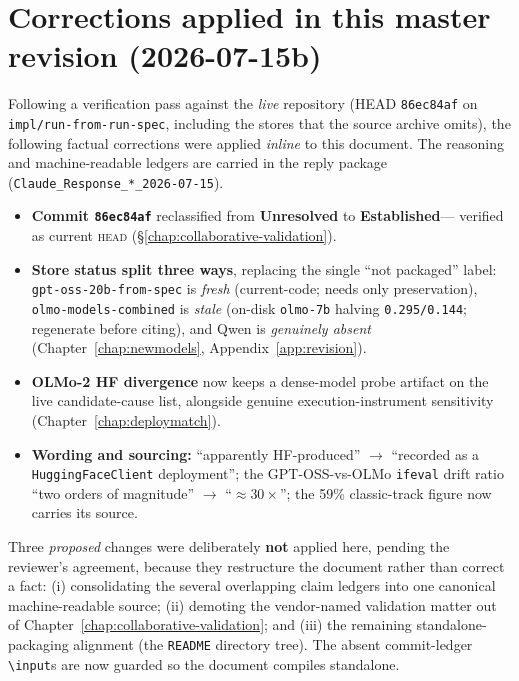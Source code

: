 \documentclass[11pt]{report}
\newcommand{\code}[1]{\texttt{#1}}
\newcommand{\file}[1]{\texttt{#1}}
\newcommand{\statusEstablished}{\textbf{Established}}
\newcommand{\statusUnresolved}{\textbf{Unresolved}}
\begin{document}
\section{Corrections applied in this master revision (2026-07-15b)}
\label{sec:corrections-applied}

Following a verification pass against the \emph{live} repository (HEAD \code{86ec84af}
on \code{impl/run-from-run-spec}, including the  stores that the source
archive omits), the following factual corrections were applied \emph{inline} to this
document. The reasoning and machine-readable ledgers are carried in the reply package
(\file{Claude\_Response\_*\_2026-07-15}).

\begin{itemize}[nosep]
  \item \textbf{Commit \code{86ec84af}} reclassified from \statusUnresolved{} to
        \statusEstablished --- verified as current \textsc{head}
        (\S\ref{chap:collaborative-validation}).
  \item \textbf{Store status split three ways}, replacing the single ``not packaged''
        label: \code{gpt-oss-20b-from-spec} is \emph{fresh} (current-code; needs only
        preservation), \code{olmo-models-combined} is \emph{stale} (on-disk
        \code{olmo-7b} halving \code{0.295/0.144}; regenerate before citing), and Qwen
        is \emph{genuinely absent} (Chapter~\ref{chap:newmodels},
        Appendix~\ref{app:revision}).
  \item \textbf{OLMo-2 HF divergence} now keeps a dense-model probe artifact on the
        live candidate-cause list, alongside genuine execution-instrument sensitivity
        (Chapter~\ref{chap:deploymatch}).
  \item \textbf{Wording and sourcing:} ``apparently HF-produced'' $\rightarrow$
        ``recorded as a \code{HuggingFaceClient} deployment''; the GPT-OSS-vs-OLMo
        \code{ifeval} drift ratio ``two orders of magnitude'' $\rightarrow$
        ``$\approx\!30\times$''; the 59\% classic-track figure now carries its source.
\end{itemize}

\noindent Three \emph{proposed} changes were deliberately \textbf{not} applied here,
pending the reviewer's agreement, because they restructure the document rather than
correct a fact: (i) consolidating the several overlapping claim ledgers into one
canonical machine-readable source; (ii) demoting the vendor-named validation matter
out of Chapter~\ref{chap:collaborative-validation}; and (iii) the remaining
standalone-packaging alignment (the \code{README} directory tree). The absent
commit-ledger \code{\textbackslash input}s are now guarded so the document compiles
standalone.
\end{document}

